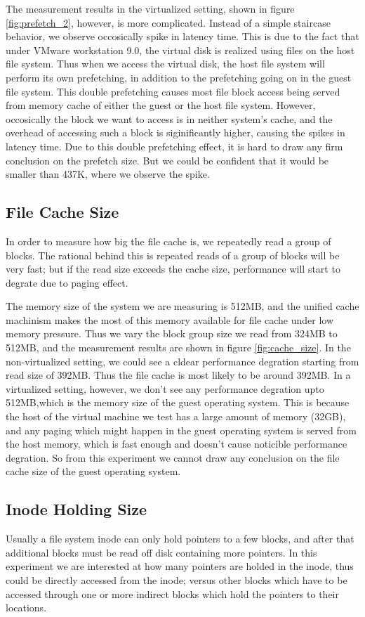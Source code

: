 The measurement results in the virtualized setting, shown in figure \ref{fig:prefetch_2}, however, is more complicated. Instead of a simple staircase behavior, we observe occosically spike in latency time. This is due to the fact that under VMware workstation 9.0, the virtual disk is realized using files on the host file system. Thus when we access the virtual disk, the host file system will perform its own prefetching, in addition to the prefetching going on in the guest file system. This double prefetching causes most file block access being served from memory cache of either the guest or the host file system. However, occosically the block we want to access is in neither system's cache, and the overhead of accessing such a block is siginificantly higher, causing the spikes in latency time. Due to this double prefetching effect, it is hard to draw any firm conclusion on the prefetch size. But we could be confident that it would be smaller than 437K, where we observe the spike. 


\subsection{File Cache Size}
In order to measure how big the file cache is, we repeatedly read a group of blocks. The rational behind this is repeated reads of a group of blocks will be very fast; but if the read size exceeds the cache size, performance will start to degrate due to paging effect.

The memory size of the system we are measuring is 512MB, and the unified cache machinism makes the most of this memory available for file cache under low memory pressure. Thus we vary the block group size we read from 324MB to 512MB, and the measurement results are shown in figure \ref{fig:cache_size}. In the non-virtualized setting, we could see a cldear performance degration starting from read size of 392MB. Thus the file cache is most likely to be around 392MB. In a virtualized setting, however, we don't see any performance degration upto 512MB,which is the memory size of the guest operating system. This is because the host of the virtual machine we test has a large amount of memory (32GB), and any paging which might happen in the guest operating system is served from the host memory, which is fast enough and doesn't cause noticible performance degration. So from this experiment we cannot draw any conclusion on the file cache size of the guest operating system.


\subsection{Inode Holding Size}
Usually a file system inode can only hold pointers to a few blocks, and after that additional blocks must be read off disk containing more pointers. In this experiment we are interested at how many pointers are holded in the inode, thus could be directly accessed from the inode; versus other blocks which have to be accessed through one or more indirect blocks which hold the pointers to their locations.

